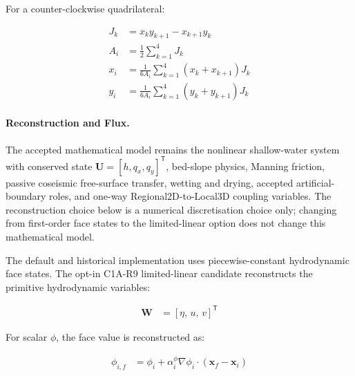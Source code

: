 For a counter-clockwise quadrilateral:

\begin{align}
  J_k
  &=
  x_k y_{k+1}
  -
  x_{k+1} y_k
  \label{eq:res-num-spec-regional-quadrilateral-jacobian-term}
  \\
  A_i
  &=
  \frac{1}{2}
  \sum_{k=1}^{4}
  J_k
  \label{eq:res-num-spec-regional-quadrilateral-area}
  \\
  x_i
  &=
  \frac{1}{6A_i}
  \sum_{k=1}^{4}
  \left(
    x_k+x_{k+1}
  \right)
  J_k
  \label{eq:res-num-spec-regional-quadrilateral-centroid-x}
  \\
  y_i
  &=
  \frac{1}{6A_i}
  \sum_{k=1}^{4}
  \left(
    y_k+y_{k+1}
  \right)
  J_k
  \label{eq:res-num-spec-regional-quadrilateral-centroid-y}
\end{align}

\paragraph{Reconstruction and Flux.}
\label{sec:res-num-spec-regional-reconstruction-flux}

The accepted mathematical model remains the nonlinear shallow-water
system with conserved state
$\mathbf{U}=[h,q_x,q_y]^{\mathsf{T}}$, bed-slope physics, Manning
friction, passive coseismic free-surface transfer, wetting and drying,
accepted artificial-boundary roles, and one-way Regional2D-to-Local3D
coupling variables. The reconstruction choice below is a numerical
discretisation choice only; changing from first-order face states to the
limited-linear option does not change this mathematical model.

The default and historical implementation uses piecewise-constant
hydrodynamic face states. The opt-in C1A-R9 limited-linear candidate
reconstructs the primitive hydrodynamic variables:

\begin{align}
  \mathbf{W}
  &=
  \left[
    \eta,\,
    u,\,
    v
  \right]^{\mathsf{T}}
  \label{eq:res-num-spec-regional-reconstruction-state}
\end{align}

For scalar $\phi$, the face value is reconstructed as:

\begin{align}
  \phi_{i,f}
  &=
  \phi_i
  +
  \alpha_i^{\phi}
  \nabla\phi_i
  \cdot
  \left(
    \mathbf{x}_f-\mathbf{x}_i
  \right)
  \label{eq:res-num-spec-regional-muscl-reconstruction}
\end{align}

